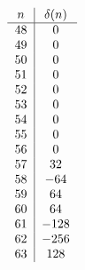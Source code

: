 \documentclass[12pt]{amsart}
\theoremstyle{definition}
\numberwithin{equation}{section}
\begin{document}
\[\begin{tabular}{c|c}
\end{tabular}\qquad
\begin{tabular}{c|c}
   $n$  &  $\delta(n)$ \\
     \hline
     48 & 0\\ 49 & 0\\ 50 & 0\\ 51 & 0\\ 52 & 0\\ 53 & 0\\ 54 & 0\\ 55 & 0\\ 56 & 0\\ 57 & 32\\ 58 & $-64$\\ 59 & 64\\60 & 64\\ 61 & $-128$\\ 62 & $-256$\\ 63 & 128
\end{tabular}
\]
\end{document}
